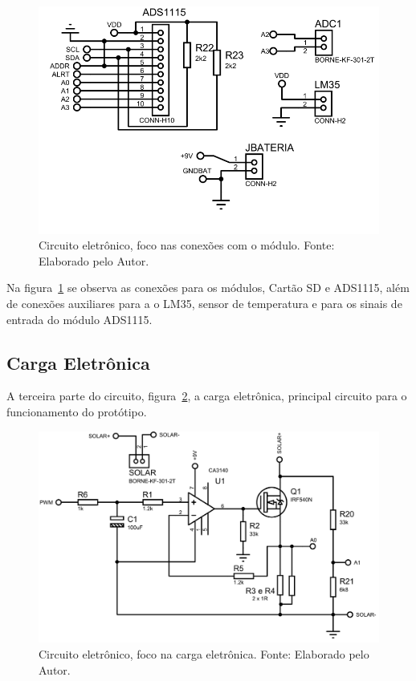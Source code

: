\begin{figure}[!htbp]
	\centering
	\includegraphics[scale=0.5]{imagens/CircuitoMod.png}
	\caption{Circuito eletrônico, foco nas conexões com o módulo. Fonte: Elaborado pelo Autor. 	}
	\label{fig:CircuitoMod}
\end{figure}
\FloatBarrier

Na figura~\ref{fig:CircuitoMod} se observa as conexões para os módulos, Cartão SD e ADS1115, além de conexões auxiliares para a o LM35, sensor de temperatura e para os sinais de entrada do módulo ADS1115.

\subsection{Carga Eletrônica}

A terceira parte do circuito,  figura~\ref{fig:CircuitoElet}, a carga eletrônica, principal circuito para o funcionamento do protótipo.

\begin{figure}[!htbp]
	\centering
	\includegraphics[scale=0.5]{imagens/CircuitoElet.png}
	\caption{Circuito eletrônico, foco na carga eletrônica. Fonte: Elaborado pelo Autor. 	}
	\label{fig:CircuitoElet}
\end{figure}
\FloatBarrier

